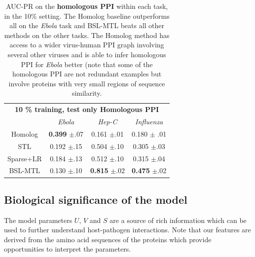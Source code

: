\documentclass{bioinfo}
\begin{document}
\begin{table}[!h]
\caption{AUC-PR on the \textbf{homologous PPI} within each task, in the 10\% setting. The Homolog baseline outperforms all on the \textit{Ebola} task and BSL-MTL beats all other methods on the other tasks. The Homolog method has access to a wider virus-human PPI graph involving several other viruses and is able to infer homologous PPI for \textit{Ebola} better (note that some of the homologous PPI are not redundant examples but involve proteins with very small regions of sequence similarity.}
\label{homresultsTable}
\begin{small}
\begin{center}
\begin{tabular}{c|ccc}
\toprule
\multicolumn{4}{c}{\textbf{10 \% training, test only Homologous PPI }} \\
& \textit{Ebola} & \textit{Hep-C} & \textit{Influenza} \\ \midrule
Homolog & \textbf{0.399} $\pm$.07 & 0.161 $\pm$.01 & 0.180 $\pm$ .01 \\
STL   & 0.192 $\pm$.15 & 0.504 $\pm$.10 & 0.305 $\pm$.03 \\
Sparse+LR & 0.184 $\pm$.13 & 0.512 $\pm$.10 & 0.315 $\pm$.04 \\ 
BSL-MTL & 0.130 $\pm$.10 & \textbf{0.815} $\pm$.02 & \textbf{0.475} $\pm$.02 \\ \bottomrule
\end{tabular}
\end{center}
\end{small}
\end{table}


\subsection{Biological significance of the model}
\label{bioanalysis}
The model parameters $U$, $V$ and $S$ are a source of rich information which can be used to further understand host-pathogen
interactions. Note that our features are derived from the amino acid sequences of the proteins which provide
opportunities to interpret the parameters.
\end{document}
